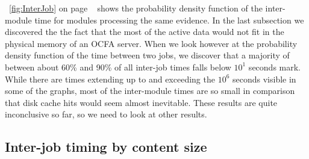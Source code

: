  ~\ref{fig:InterJob} on page ~\pageref{fig:InterJob} shows the probability density function of the inter-module time for modules processing the same evidence.
In the last subsection we discovered the the fact that the most of the active data would not fit in the physical memory of an OCFA server. When we look however at the probability density function of the time between two jobs, we discover that a majority of between about 60\% and 90\% of all inter-job times falls below $10^1$ seconds mark. While there are times extending up to and exceeding the $10^6$ seconds visible in some of the graphs, most of the inter-module times are so small in comparison that disk cache hits would seem almost inevitable. These results are quite inconclusive so far, so we need to look at other results.
\subsection{Inter-job timing by content size}
